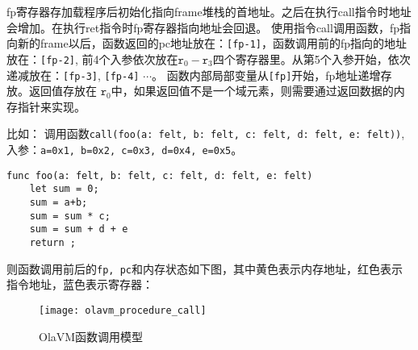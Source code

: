 fp寄存器存加载程序后初始化指向frame堆栈的首地址。之后在执行call指令时地址会增加。在执行ret指令时fp寄存器指向地址会回退。
使用指令call调用函数，fp指向新的frame以后，函数返回的pc地址放在：\texttt{[fp-1]}，函数调用前的fp指向的地址放在：\texttt{[fp-2]}, 前4个入参依次放在$\texttt{r}_0 - \texttt{r}_{3}$四个寄存器里。从第5个入参开始，依次递减放在：\texttt{[fp-3]}, \texttt{[fp-4]} $\cdots$。
函数内部局部变量从\texttt{[fp]}开始，fp地址递增存放。返回值存放在 $\texttt{r}_0$中，如果返回值不是一个域元素，则需要通过返回数据的内存指针来实现。

比如： 调用函数\texttt{call(foo(a: felt, b: felt, c: felt, d: felt, e: felt))}, 入参：\texttt{a=0x1, b=0x2, c=0x3, d=0x4, e=0x5}。
\begin{lstlisting}[label={lst:lstlisting}]
func foo(a: felt, b: felt, c: felt, d: felt, e: felt)
    let sum = 0;
    sum = a+b;
    sum = sum * c;
    sum = sum + d + e
    return ;
\end{lstlisting}

则函数调用前后的\texttt{fp, pc}和内存状态如下图，其中黄色表示内存地址，红色表示指令地址，蓝色表示寄存器：
\begin{figure}[!htp]
    \centering
    \texttt{[image: olavm\_procedure\_call]}
    \caption{OlaVM函数调用模型}
    \label{fig:processor call}
\end{figure}


